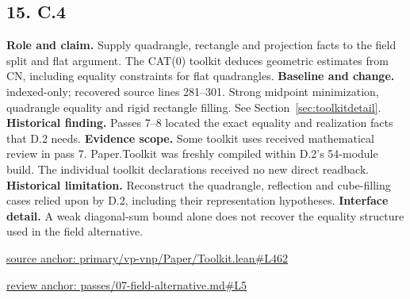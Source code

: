 \documentclass[11pt,letterpaper]{article}
\theoremstyle{definition}\newtheorem{definition}[theorem]{Definition}\newtheorem{example}[theorem]{Example}
\theoremstyle{remark}\newtheorem{remark}[theorem]{Remark}
\begin{document}
\subsection*{15. C.4}
\textbf{Role and claim.} Supply quadrangle, rectangle and projection facts to the field split and flat argument. The CAT(0) toolkit deduces geometric estimates from CN, including equality constraints for flat quadrangles.
\textbf{Baseline and change.} indexed-only; recovered source lines 281--301. Strong midpoint minimization, quadrangle equality and rigid rectangle filling. See Section~\ref{sec:toolkitdetail}.
\textbf{Historical finding.} Passes 7–8 located the exact equality and realization facts that D.2 needs.
\textbf{Evidence scope.} Some toolkit uses received mathematical review in pass 7. Paper.Toolkit was freshly compiled within D.2's 54-module build. The individual toolkit declarations received no new direct readback.
\textbf{Historical limitation.} Reconstruct the quadrangle, reflection and cube-filling cases relied upon by D.2, including their representation hypotheses.
\textbf{Interface detail.} A weak diagonal-sum bound alone does not recover the equality structure used in the field alternative.
\par\href{https://github.com/nousentllc/VP-VNP-Review/blob/8a7976933b6b2b4ffda1ad3a0dfb5fc6b6f023e8/primary/vp-vnp/Paper/Toolkit.lean\#L462}{source anchor: primary/vp-vnp/Paper/Toolkit.lean\#L462}
\par\href{https://github.com/nousentllc/VP-VNP-Review/blob/8a7976933b6b2b4ffda1ad3a0dfb5fc6b6f023e8/passes/07-field-alternative.md\#L5}{review anchor: passes/07-field-alternative.md\#L5}
\goodbreak
\end{document}
